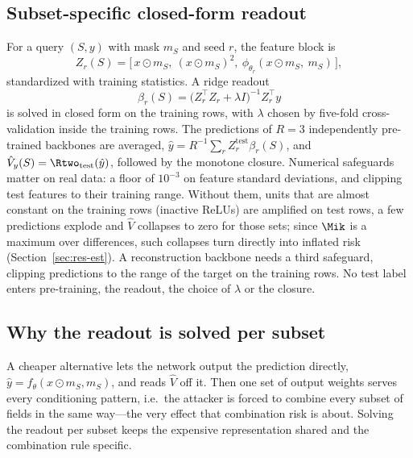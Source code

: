 \subsection{Subset-specific closed-form readout}
For a query $(S,y)$ with mask $m_S$ and seed $r$, the feature block is
\begin{equation}
Z_{r}(S) = \big[\, x\odot m_S,\ (x \odot m_S)^{2},\ \phi_{\theta_r}(x\odot m_S,\ m_S) \,\big],
\end{equation}
standardized with training statistics. A ridge readout
\begin{equation}\label{eq:ridge}
\beta_{r}(S) = \big(Z_r^{\top} Z_r + \lambda I\big)^{-1} Z_r^{\top} y
\end{equation}
is solved in closed form on the training rows, with $\lambda$ chosen by five-fold
cross-validation inside the training rows. The predictions of $R=3$ independently pre-trained
backbones are averaged, $\hat y = R^{-1}\sum_r Z_r^{\mathrm{test}}\beta_r(S)$, and
$\hat V_y(S)=\Rtwo_{\mathrm{test}}(\hat y)$, followed by the monotone closure. Numerical
safeguards matter on real data: a floor of $10^{-3}$ on feature standard deviations, and
clipping test features to their training range. Without them, units that are almost constant
on the training rows (inactive ReLUs) are amplified on test rows, a few predictions explode and
$\hat V$ collapses to zero for those sets; since $\Mik$ is a maximum over differences, such
collapses turn directly into inflated risk (Section~\ref{sec:res-est}). A reconstruction backbone
needs a third safeguard, clipping predictions to the range of the target on the training rows. No test label enters
pre-training, the readout, the choice of $\lambda$ or the closure.

\subsection{Why the readout is solved per subset}
A cheaper alternative lets the network output the prediction directly, $\hat y=f_\theta(x\odot
m_S, m_S)$, and reads $\hat V$ off it. Then one set of output weights serves every
conditioning pattern, i.e.\ the attacker is forced to combine every subset of fields in the
same way---the very effect that combination risk is about. Solving the readout per subset
keeps the expensive representation shared and the combination rule specific.

